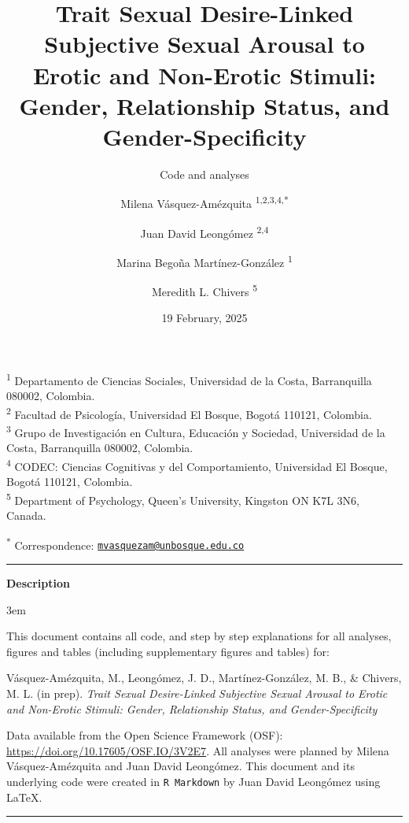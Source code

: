 \documentclass[
  bookmarksnumbered]{article}
\title{Trait Sexual Desire-Linked Subjective Sexual Arousal to Erotic and Non-Erotic Stimuli: Gender, Relationship Status, and Gender-Specificity}
\subtitle{Code and analyses}
\author{Milena Vásquez-Amézquita \orcidlink{0000-0001-7317-8430}\textsuperscript{1,2,3,4,*} \and Juan David Leongómez \orcidlink{0000-0002-0092-6298}\textsuperscript{2,4} \and Marina Begoña Martínez-González \orcidlink{0000-0002-5840-6383}\textsuperscript{1} \and Meredith L. Chivers \orcidlink{0000-0002-5495-9263}\textsuperscript{5}}
\date{19 February, 2025}
\begin{document}
\maketitle

\textsuperscript{1} Departamento de Ciencias Sociales, Universidad de la Costa, Barranquilla 080002, Colombia.\\
\textsuperscript{2} Facultad de Psicología, Universidad El Bosque, Bogotá 110121, Colombia.\\
\textsuperscript{3} Grupo de Investigación en Cultura, Educación y Sociedad, Universidad de la Costa, Barranquilla 080002, Colombia.\\
\textsuperscript{4} CODEC: Ciencias Cognitivas y del Comportamiento, Universidad El Bosque, Bogotá 110121, Colombia.\\
\textsuperscript{5} Department of Psychology, Queen's University, Kingston ON K7L 3N6, Canada.

\textsuperscript{*} Correspondence: \href{mailto:mvasquezam@unbosque.edu.co}{\href{mailto:mvasquezam@unbosque.edu.co}{\nolinkurl{mvasquezam@unbosque.edu.co}}}

\begin{center}\rule{0.5\linewidth}{0.5pt}\end{center}

\begin{center}
\textbf{Description}
\end{center}

\par
\begingroup
\leftskip3em
\rightskip\leftskip

This document contains all code, and step by step explanations for all analyses, figures and tables (including supplementary figures and tables) for:

\begin{hangparas}{.25in}{1}
Vásquez-Amézquita, M., Leongómez, J. D., Martínez-González, M. B., \& Chivers, M. L. (in prep). \textit{Trait Sexual Desire-Linked Subjective Sexual Arousal to Erotic and Non-Erotic Stimuli: Gender, Relationship Status, and Gender-Specificity}
\end{hangparas}

Data available from the Open Science Framework (OSF): \url{https://doi.org/10.17605/OSF.IO/3V2E7}. All analyses were planned by Milena Vásquez-Amézquita and Juan David Leongómez. This document and its underlying code were created in \texttt{R\ Markdown} by Juan David Leongómez using \LaTeX.

\begin{center}\rule{0.5\linewidth}{0.5pt}\end{center}
\end{document}
